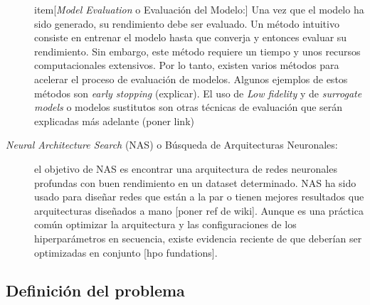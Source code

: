\begin{description}
	item[\textit{Model Evaluation} o Evaluación del Modelo:] Una vez que el modelo ha sido generado, su rendimiento debe ser evaluado. Un método intuitivo consiste en entrenar el modelo hasta que converja y entonces evaluar su rendimiento. Sin embargo, este método requiere un tiempo y unos recursos computacionales extensivos. Por lo tanto, existen varios métodos para acelerar el proceso de evaluación de modelos. Algunos ejemplos de estos métodos son \textit{early stopping} (explicar). El uso de \textit{Low fidelity} y de \textit{surrogate models} o modelos sustitutos son otras técnicas de evaluación que serán explicadas más adelante (poner link)
	
	\item [\textit{Neural Architecture Search} (NAS) o Búsqueda de Arquitecturas Neuronales:] el objetivo de NAS es encontrar una arquitectura de redes neuronales profundas con buen rendimiento en un dataset determinado. NAS ha sido usado para diseñar redes que están a la par o tienen mejores resultados que arquitecturas diseñados a mano [poner ref de wiki]. Aunque es una práctica común optimizar la arquitectura y las configuraciones de los hiperparámetros en secuencia, existe evidencia reciente de que deberían ser optimizadas en conjunto [hpo fundations].
\end{description}

\subsection{Definición del problema}\label{subsec:automl_problem_definition}


